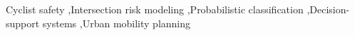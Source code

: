 \documentclass[preprint,12pt]{elsarticle}
\begin{document}
\begin{frontmatter}

\begin{keyword}

Cyclist safety \sep Intersection risk modeling \sep Probabilistic classification \sep Decision-support systems \sep Urban mobility planning

\end{keyword}

\end{frontmatter}
\end{document}
